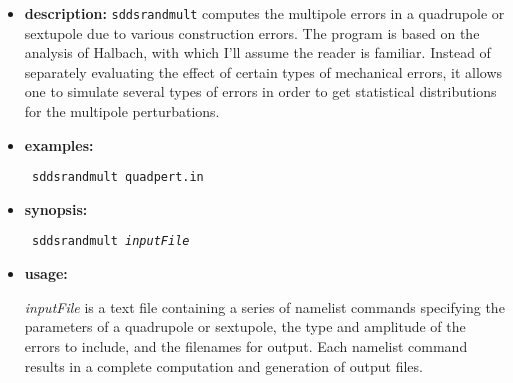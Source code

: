 \documentclass[11pt]{article}
\begin{document}
\begin{itemize}
\item {\bf description:} {\tt sddsrandmult} computes the multipole
errors in a quadrupole or sextupole due to various construction
errors.  The program is based on the analysis of
Halbach\cite{Halbach_69a}, with which I'll assume the reader is
familiar.  Instead of separately evaluating the effect of certain
types of mechanical errors, it allows one to simulate several types of
errors in order to get statistical distributions for the multipole
perturbations.

\item {\bf examples:}
\begin{flushleft}{\tt
sddsrandmult quadpert.in
}\end{flushleft}

\item {\bf synopsis:}
\begin{flushleft}{\tt
sddsrandmult {\em inputFile}
}\end{flushleft}

\item {\bf usage:}

{\em inputFile} is a text file containing a series of namelist commands specifying
the parameters of a quadrupole or sextupole, the type and amplitude of the errors
to include, and the filenames for output.  Each namelist command results in a
complete computation and generation of output files.


\end{itemize}
\end{document}
